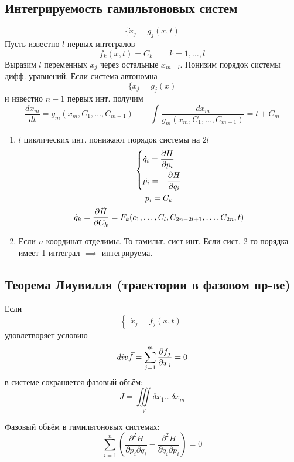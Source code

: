 \documentclass{article}
\begin{document}
\subsection{Интегрируемость гамильтоновых систем}
  \[
    \{\dot{x}_j=g_j(x,t)
  \]
  Пусть известно $l$ первых интегралов
  \[
    f_k(x,t)=C_k \qquad k=1,\dots ,l
  \]
  Выразим $l$ переменных $x_j$ через остальные $x_{m-l}$.
  Понизим порядок системы дифф. уравнений.
  Если система автономна
  \[
    \{\dot{x}_j=g_j(x)
    \]
    и известно $n-1$ первых инт. получим
  \[
    \frac{dx_m}{dt}=g_m(x_m,C_1,\dots ,C_{m-1}) \qquad \int_{}^{}\frac{dx_m}{g_m(x_m,C_1,\dots ,C_{m-1})}=t+C_m
  \]

\begin{enumerate}
  \item $l$ циклических инт. понижают порядок системы на $2l$
    \begin{gather*}
      \left\{\begin{aligned}
        &\dot{q}_i=\frac{\partial{H}}{\partial{p_i}} \\ 
        &\dot{p_i}=-\frac{\partial{H}}{\partial{q_i}}
      \end{aligned}\right. \\ 
      p_i = C_k \\ 
      \dot{q}_k=\frac{\partial{\tilde{H}}}{\partial{C_k}}=F_k(c_1,\dots ,C_l,C_{2n-2l+1},\dots ,C_{2n},t)
    \end{gather*}
  \item Если $n$ координат отделимы. То гамильт. сист инт.
    Если сист. 2-го порядка имеет 1-интеграл $\implies$ интегрируема.
\end{enumerate}


\subsection{Теорема Лиувилля (траектории в фазовом пр-ве)}

\begin{theorem} \phantom{.}

  Если
  \[
    \left\{\begin{aligned}
      \dot{x}_j=f_j(x,t)
    \end{aligned}\right.
  \]
  удовлетворяет условию
  \[
    div \vec{f}=\sum_{j=1}^{m}\frac{\partial{f_j}}{\partial{x_j}}=0
  \]
  в системе сохраняется фазовый объём:
  \[
    J=\iiint \limits_V \delta x_1\dots \delta x_m
  \]
\end{theorem}
\begin{remark}
  Фазовый объём в гамильтоновых системах:
  \[
    \sum_{i=1}^{n}\left(\frac{\partial^{2}H}{\partial p_i\partial q_i}-\frac{\partial^{2}H}{\partial q_i \partial p_i}\right)=0
  \]
\end{remark}
\end{document}
